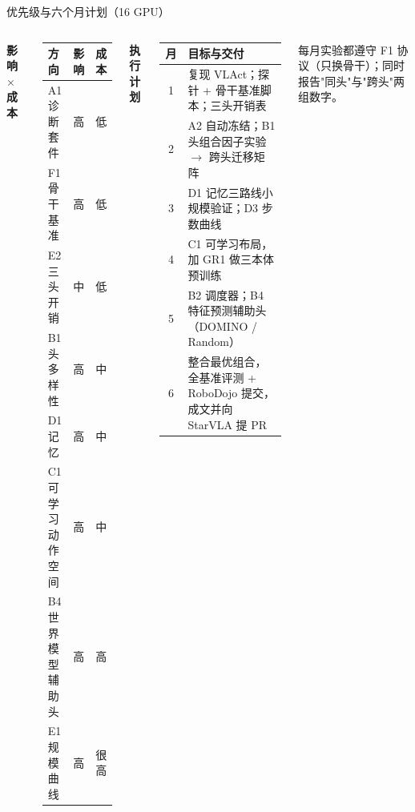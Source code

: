 \documentclass[aspectratio=169,10pt]{beamer}
\newcommand{\HL}[1]{\textcolor{emphasis}{#1}}
\begin{document}
\begin{frame}{优先级与六个月计划（16 GPU）}
  \begin{columns}[T]
    \textbf{影响 $\times$ 成本}
    \begin{center}\footnotesize
    \begin{tabular}{lll}
      \toprule
      方向 & 影响 & 成本 \\
      \midrule
      \HL{A1 诊断套件} & 高 & 低 \\
      \HL{F1 骨干基准} & 高 & 低 \\
      \HL{E2 三头开销} & 中 & 低 \\
      B1 头多样性 & 高 & 中 \\
      D1 记忆 & 高 & 中 \\
      C1 可学习动作空间 & 高 & 中 \\
      B4 世界模型辅助头 & 高 & 高 \\
      E1 规模曲线 & 高 & 很高 \\
      \bottomrule
    \end{tabular}
    \end{center}
    \textbf{执行计划}
    \begin{center}\footnotesize
    \begin{tabular}{cp{6.2cm}}
      \toprule
      月 & 目标与交付 \\
      \midrule
      1 & 复现 VLAct；探针 + 骨干基准脚本；三头开销表 \\
      2 & A2 自动冻结；B1 头组合因子实验 $\to$ 跨头迁移矩阵 \\
      3 & D1 记忆三路线小规模验证；D3 步数曲线 \\
      4 & C1 可学习布局，加 GR1 做三本体预训练 \\
      5 & B2 调度器；B4 特征预测辅助头（DOMINO / Random） \\
      6 & 整合最优组合，全基准评测 + RoboDojo 提交，成文并向 StarVLA 提 PR \\
      \bottomrule
    \end{tabular}
    \end{center}
    \footnotesize 每月实验都遵守 F1 协议（只换骨干）；同时报告"同头"与"跨头"两组数字。
  \end{columns}
\end{frame}
\end{document}
